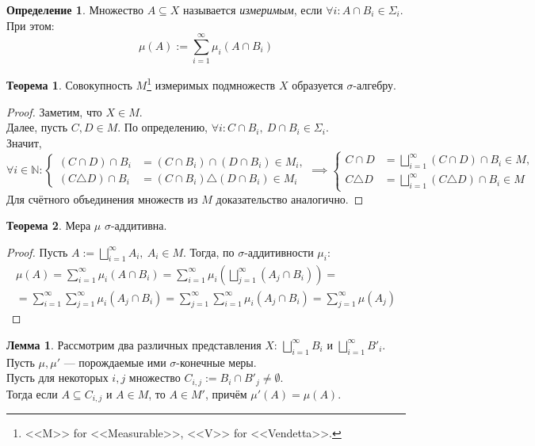 \documentclass[11pt,a4paper]{report}
\def\Natural{\mathbb{N}}
\theoremstyle{definition}
\theoremstyle{definition}
\newtheorem{theorem}{Теорема}[section]
\newtheorem{lemma}{Лемма}[section]
\theoremstyle{definition}
\newtheorem{definition}{Определение}[section]
\begin{document}
	\begin{definition}
		Множество $ A \subseteq X $ называется \textit{измеримым}, если $ \forall i: A \cap B_{i} \in \Sigma_{i} $.\\
		При этом: \[ \mu(A) := \sum_{i=1}^{\infty}{\mu_{i}(A \cap B_{i})} \]
	\end{definition}
	\begin{theorem}
		Совокупность $ M $\footnote{<<M>> for <<Measurable>>, <<V>> for <<Vendetta>>.} измеримых подмножеств $ X $ образуется $ \sigma $-алгебру.
	\end{theorem}
	\begin{proof}
		Заметим, что $ X \in M $.\\
		Далее, пусть $ C, D \in M $. По определению, $ \forall i: C \cap B_{i},\ D \cap B_{i} \in \Sigma_{i} $.\\
		Значит, 
		\[\forall i \in \Natural:  
		\begin{cases} 
			(C \cap D) \cap B_{i} &= (C \cap B_{i}) \cap (D \cap B_{i}) \in M_{i},\\
			(C \triangle D) \cap B_{i} &= (C \cap B_{i}) \triangle (D \cap B_{i}) \in M_{i}
		\end{cases} \implies 
		\begin{cases}
			C \cap D &= \bigsqcup\limits_{i=1}^{\infty}{(C \cap D) \cap B_{i}} \in M,\\
			C \triangle D &= \bigsqcup\limits_{i=1}^{\infty}{(C \triangle D) \cap B_{i}} \in M
		\end{cases} \]
	 Для счётного объединения множеств из $ M $ доказательство аналогично.
	\end{proof}
	\begin{theorem}
		Мера $ \mu $ $ \sigma $-аддитивна.
	\end{theorem}
	\begin{proof}
		Пусть $ A := \bigsqcup\limits_{i=1}^{\infty}{A_{i}},\ A_{i} \in M $. Тогда, по $ \sigma $-аддитивности $ \mu_{i} $:
		\begin{gather*}
			\mu(A) = \sum_{i=1}^{\infty}\mu_{i}(A \cap B_{i}) = \sum_{i=1}^{\infty}\mu_{i}\left (\bigsqcup\limits_{j=1}^{\infty}{(A_{j} \cap B_{i})}\right ) =\\= \sum_{i=1}^{\infty}\sum\limits_{j=1}^{\infty}{\mu_{i}(A_{j} \cap B_{i})} = \sum_{j=1}^{\infty}\sum\limits_{i=1}^{\infty}{\mu_{i}(A_{j} \cap B_{i})} = \sum_{j=1}^{\infty}{\mu(A_{j})}
		\end{gather*}
	\end{proof}
	\begin{lemma}
		Рассмотрим два различных представления $ X $: $ \bigsqcup_{i=1}^{\infty}{B_{i}} $ и $ \bigsqcup_{i=1}^{\infty}{B'_{i}} $.\\
		Пусть $ \mu, \mu' $ — порождаемые ими $ \sigma $-конечные меры.\\ 
		Пусть для некоторых $ i, j $ множество $ C_{i, j} := B_{i} \cap B'_{j} \neq \emptyset $.\\ 
		Тогда если $ A \subseteq C_{i, j} $ и $ A \in M $, то $ A \in M' $, причём $ \mu'(A) = \mu(A) $.  
	\end{lemma}
\end{document}
